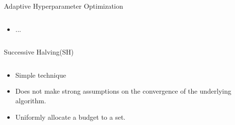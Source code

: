 \begin{frame}{Adaptive Hyperparameter Optimization}
\begin{columns}
\begin{column}{.45\linewidth}
\begin{itemize}
\begin{itemize}
	    \item ...
	\end{itemize}
\end{itemize}
\end{column}

\begin{column}{.45\textwidth}

\end{column}

\end{columns}

\end{frame}


\begin{frame}{Successive Halving(SH)}
\begin{columns}

\begin{column}{.45\textwidth}
\vspace{-1em}
\begin{itemize}
    \item Simple technique
    \item Does not make strong assumptions on the convergence of the underlying algorithm.
    \pause
    \item Uniformly allocate a budget to a set.
    \pause
\end{itemize}
\end{column}


\end{columns}
\end{frame}
